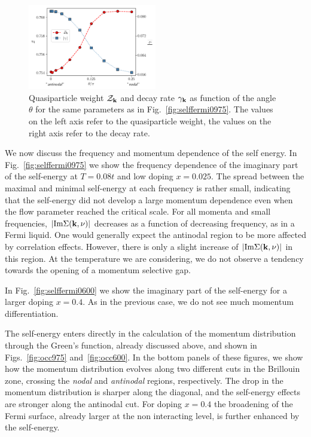 \begin{figure}
\includegraphics[width=0.5\textwidth]{images/z_and_gamma975.png}
\caption{Quasiparticle weight $\mathcal{Z}_{\mathbf{k} }$ and decay rate $\gamma_{\bf{k}}$ as function of the angle $\theta$ for the same parameters as in Fig.~\ref{fig:selffermi0975}. 
The values on the left axis refer to the quasiparticle weight, the values on the right axis refer to the decay rate.}
\label{fig:zetaandgamma}
\end{figure}


We now discuss the frequency and momentum dependence of the self energy. 
In Fig.~\ref{fig:selffermi0975}  we show the frequency dependence of the imaginary part of the self-energy at $T=0.08t$ and low doping $x=0.025$. 
The spread between the maximal and minimal self-energy at each frequency is rather small, indicating that the self-energy did not develop a large momentum dependence even when the flow parameter reached the critical scale. 
For all momenta and small frequencies, $|\mathrm{Im}\Sigma(\mathbf{k},\nu)|$ decreases as a function of decreasing frequency, as in a Fermi liquid. 
One would generally expect the antinodal region to be more affected by correlation effects. However, there is only a slight increase of $|\mathrm{Im}\Sigma(\mathbf{k},\nu)|$ in this region. At the temperature we are considering, we do not observe a tendency towards the opening of a momentum selective gap. 

In Fig.~\ref{fig:selffermi0600} we show the imaginary part of the self-energy for a larger doping $x=0.4$. As in the previous case, we do not see much momentum differentiation.

The self-energy enters directly in the calculation of the momentum distribution through the Green's function, already discussed above, and shown in Figs.~\ref{fig:occ975} and~\ref{fig:occ600}.
In the bottom panels of these figures, we show how the momentum distribution evolves along two different cuts in the Brillouin zone, crossing the \textit{nodal} and \textit{antinodal} regions, respectively.
The drop in the momentum distribution is sharper along the diagonal, and the self-energy effects are stronger along the antinodal cut.
For doping $x=0.4$ the broadening of the Fermi surface, already larger at the non interacting level, is further enhanced by the self-energy.

